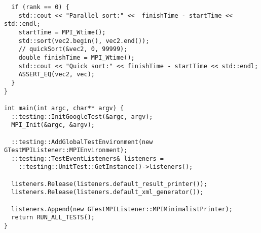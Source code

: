 \documentclass[a4paper]{report}
\begin{document}
\begin{lstlisting}
  if (rank == 0) {
    std::cout << "Parallel sort:" <<  finishTime - startTime << std::endl;
    startTime = MPI_Wtime();
    std::sort(vec2.begin(), vec2.end());
    // quickSort(&vec2, 0, 99999);
    double finishTime = MPI_Wtime();
    std::cout << "Quick sort:" << finishTime - startTime << std::endl;
    ASSERT_EQ(vec2, vec);
  }
}

int main(int argc, char** argv) {
  ::testing::InitGoogleTest(&argc, argv);
  MPI_Init(&argc, &argv);

  ::testing::AddGlobalTestEnvironment(new GTestMPIListener::MPIEnvironment);
  ::testing::TestEventListeners& listeners =
    ::testing::UnitTest::GetInstance()->listeners();

  listeners.Release(listeners.default_result_printer());
  listeners.Release(listeners.default_xml_generator());

  listeners.Append(new GTestMPIListener::MPIMinimalistPrinter);
  return RUN_ALL_TESTS();
}
\end{lstlisting}
\end{document}
